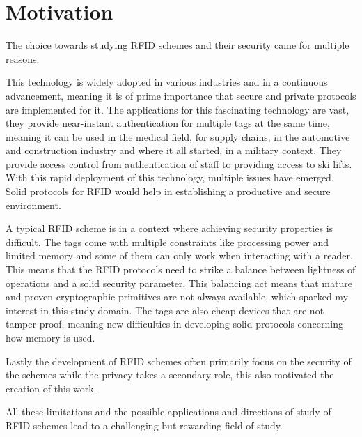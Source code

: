 \chapter*{Motivation} 

The choice towards studying RFID schemes and their security came for multiple reasons. 

This technology is widely adopted in various industries and in a continuous advancement, meaning it is of prime importance
that secure and private protocols are implemented for it. The applications for this fascinating technology are vast, they provide 
near-instant authentication for multiple tags at the same time, meaning it can be used in the medical field, for supply chains, in 
the automotive and construction industry and where it all started, in a military context. They provide access control from authentication 
of staff to providing access to ski lifts. With this rapid deployment of this technology, multiple issues have emerged. 
Solid protocols for RFID would help in establishing a productive and secure environment.

A typical RFID scheme is in a context where achieving security properties is difficult. The tags come with multiple 
constraints like processing power and limited memory and some of them can only work when interacting with a reader. This means 
that the RFID protocols need to strike a balance between lightness of operations and a solid security parameter. This balancing act means
that mature and proven cryptographic primitives are not always available, which sparked my interest in this study domain.
The tags are also cheap devices that are not tamper-proof, meaning new difficulties in developing solid protocols concerning how
memory is used.

Lastly the development of RFID schemes often primarily focus on the security of the schemes while the privacy takes a secondary role, this
also motivated the creation of this work.

All these limitations and the possible applications and directions of study of RFID schemes lead to a challenging but rewarding 
field of study.